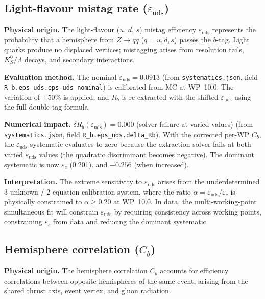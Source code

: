 \documentclass[11pt,a4paper]{article}
\begin{document}
\subsection{Light-flavour mistag rate ($\varepsilon_\mathrm{uds}$)}
\label{sec:syst_eps_uds}

\textbf{Physical origin.} The light-flavour ($u$, $d$, $s$) mistag efficiency
$\varepsilon_\mathrm{uds}$ represents the probability that a hemisphere from
$Z \to q\bar{q}$ ($q = u, d, s$) passes the $b$-tag. Light quarks produce no
displaced vertices; mistagging arises from resolution tails, $K_S^0/\Lambda$
decays, and secondary interactions.

\textbf{Evaluation method.} The nominal $\varepsilon_\mathrm{uds} = 0.0913$
(from \texttt{systematics.json}, field \texttt{R\_b.eps\_uds.eps\_uds\_nominal})
is calibrated from MC at WP~10.0. The variation of $\pm 50\%$ is applied, and
$R_b$ is re-extracted with the shifted $\varepsilon_\mathrm{uds}$ using the
full double-tag formula.

\textbf{Numerical impact.}
$\delta R_b(\varepsilon_\mathrm{uds}) = 0.000$ (solver failure at varied values)
(from \texttt{systematics.json}, field \texttt{R\_b.eps\_uds.delta\_Rb}).
With the corrected per-WP $C_b$, the $\varepsilon_\mathrm{uds}$ systematic evaluates to zero
because the extraction solver fails at both varied $\varepsilon_\mathrm{uds}$ values (the
quadratic discriminant becomes negative). The dominant systematic is now $\varepsilon_c$ (0.201).
and $-0.256$ (when increased).

\textbf{Interpretation.} The extreme sensitivity to $\varepsilon_\mathrm{uds}$ arises
from the underdetermined 3-unknown / 2-equation calibration system, where the ratio
$\alpha = \varepsilon_\mathrm{uds}/\varepsilon_c$ is physically constrained to
$\alpha \geq 0.20$ at WP~10.0. In data, the multi-working-point simultaneous fit
will constrain $\varepsilon_\mathrm{uds}$ by requiring consistency across working
points, constraining $\varepsilon_c$ from data and reducing the dominant systematic.

\subsection{Hemisphere correlation ($C_b$)}
\label{sec:syst_cb}

\textbf{Physical origin.} The hemisphere correlation $C_b$ accounts for efficiency
correlations between opposite hemispheres of the same event, arising from the shared
thrust axis, event vertex, and gluon radiation.
\end{document}

